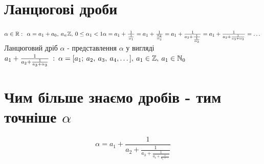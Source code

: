 \documentclass[a4paper,12pt, centered]{bookest}
\begin{document}
\begin{appendices}
\section{Ланцюгові дроби}
$\alpha\in\mathbb{R}:\>\>\alpha=a_1+a_0,\>a_\in\mathbb{Z},\>0\leq\alpha_1<1\\
\alpha=a_1+\frac{1}{\frac{1}{\alpha_1}}=a_1+\frac{1}{\frac{a_2}{\alpha_2}}=a_1+\frac{1}{a_2+\frac{1}{\frac{1}{\alpha_2}}}=a_1+\frac{1}{a_2+\frac{1}{a_3+\alpha_3}}=\dots\\$
Ланцюговий дріб $\alpha$ - представлення $\alpha$ у вигляді $a_1+\frac{1}{a_2+\frac{1}{a_3+\alpha_3}}\>:\>\alpha=[a_1;\>a_2,\>a_3,\>a_4,\dots],\\\>a_1\in\mathbb{Z},\>a_1\in\mathbb{N}_0$
\section{Чим більше знаємо дробів - тим точніше $\alpha$}
$$\alpha=a_1+\frac{1}{a_2+\frac{1}{a_3+\frac{1}{a_4+\frac{1}{a_5+\dots}}}}$$

\end{appendices}
\end{document}

